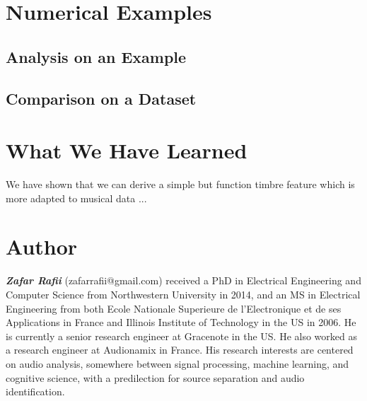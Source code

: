 \documentclass[journal]{IEEEtran}
\begin{document}
\section{Numerical Examples} %

\subsection{Analysis on an Example}



\subsection{Comparison on a Dataset}





\section{What We Have Learned}

We have shown that we can derive a simple but function timbre feature which is more adapted to musical data ...




\section{Author}

\textit{\textbf{Zafar Rafii}} (zafarrafii@gmail.com) received a PhD in Electrical Engineering and Computer Science from Northwestern University in 2014, and an MS in Electrical Engineering from both Ecole Nationale Superieure de l’Electronique et de ses Applications in France and Illinois Institute of Technology in the US in 2006. He is currently a senior research engineer at Gracenote in the US. He also worked as a research engineer at Audionamix in France. His research interests are centered on audio analysis, somewhere between signal processing, machine learning, and cognitive science, with a predilection for source separation and audio identification.



\end{document}
